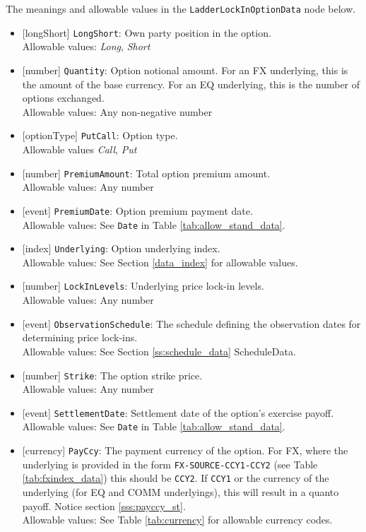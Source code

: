 The meanings and allowable values in the \lstinline!LadderLockInOptionData! node below.
 
\begin{itemize} 
  \item{}[longShort] \lstinline!LongShort!: Own party position in the option. \\
  Allowable values: \emph{Long}, \emph{Short}
  \item{}[number] \lstinline!Quantity!: Option notional amount. For an FX underlying, this is the amount of
  the base currency. For an EQ underlying, this is the number of options exchanged. \\
  Allowable values: Any non-negative number
  \item{}[optionType] \lstinline!PutCall!: Option type. \\
  Allowable values \emph{Call}, \emph{Put}
  \item{}[number] \lstinline!PremiumAmount!: Total option premium amount. \\
  Allowable values: Any number
  \item{}[event] \lstinline!PremiumDate!: Option premium payment date. \\
  Allowable values: See \lstinline!Date! in Table \ref{tab:allow_stand_data}.
  \item{}[index] \lstinline!Underlying!: Option underlying index. \\
  Allowable values: See Section \ref{data_index} for allowable values.
  \item{}[number] \lstinline!LockInLevels!: Underlying price lock-in levels. \\
  Allowable values: Any number
  \item{}[event] \lstinline!ObservationSchedule!: The schedule defining the observation dates for determining price lock-ins. \\
  Allowable values: See Section \ref{ss:schedule_data} ScheduleData.
  \item{}[number] \lstinline!Strike!: The option strike price. \\
  Allowable values: Any number
  \item{}[event] \lstinline!SettlementDate!: Settlement date of the option's exercise payoff. \\
  Allowable values: See \lstinline!Date! in Table \ref{tab:allow_stand_data}.
  \item{}[currency] \lstinline!PayCcy!: The payment currency of the option. For FX, where the underlying is provided
      in the form \lstinline!FX-SOURCE-CCY1-CCY2! (see Table \ref{tab:fxindex_data}) this should
      be \lstinline!CCY2!. If \lstinline!CCY1! or the currency of the underlying (for EQ and
      COMM underlyings), this will result in a quanto payoff. Notice section \ref{sss:payccy_st}. \\
        Allowable values: See Table \ref{tab:currency} for allowable currency codes.
\end{itemize}

